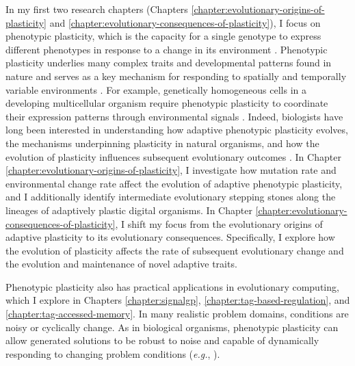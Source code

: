 In my first two research chapters (Chapters \ref{chapter:evolutionary-origins-of-plasticity} and \ref{chapter:evolutionary-consequences-of-plasticity}), I focus on phenotypic plasticity, which is the capacity for a single genotype to express different phenotypes in response to a change in its environment \citep{west-eberhard_developmental_2003}.
Phenotypic plasticity underlies many complex traits and developmental patterns found in nature and serves as a key mechanism for responding to spatially and temporally variable environments \citep{bradshaw_evolutionary_1965}.
For example, genetically homogeneous cells in a developing multicellular organism require phenotypic plasticity to coordinate their expression patterns through environmental signals \citep{schlichting_origins_2003}.
Indeed, biologists have long been interested in understanding how adaptive phenotypic plasticity evolves, the mechanisms underpinning plasticity in natural organisms, and how the evolution of plasticity influences subsequent evolutionary outcomes \citep{gibert_phenotypic_2019}.
In Chapter \ref{chapter:evolutionary-origins-of-plasticity}, I investigate how mutation rate and environmental change rate affect the evolution of adaptive phenotypic plasticity, and I additionally identify intermediate evolutionary stepping stones along the lineages of adaptively plastic digital organisms. 
In Chapter \ref{chapter:evolutionary-consequences-of-plasticity}, I shift my focus from the evolutionary origins of adaptive plasticity to its evolutionary consequences.
Specifically, I explore how the evolution of plasticity affects the rate of subsequent evolutionary change and the evolution and maintenance of novel adaptive traits. 

Phenotypic plasticity also has practical applications in evolutionary computing, which I explore in Chapters \ref{chapter:signalgp}, \ref{chapter:tag-based-regulation}, and \ref{chapter:tag-accessed-memory}.
In many realistic problem domains, conditions are noisy or cyclically change.
As in biological organisms, phenotypic plasticity can allow generated solutions to be robust to noise and capable of dynamically responding to changing problem conditions (\textit{e.g.}, \citealt{soltoggio_born_2018}).

